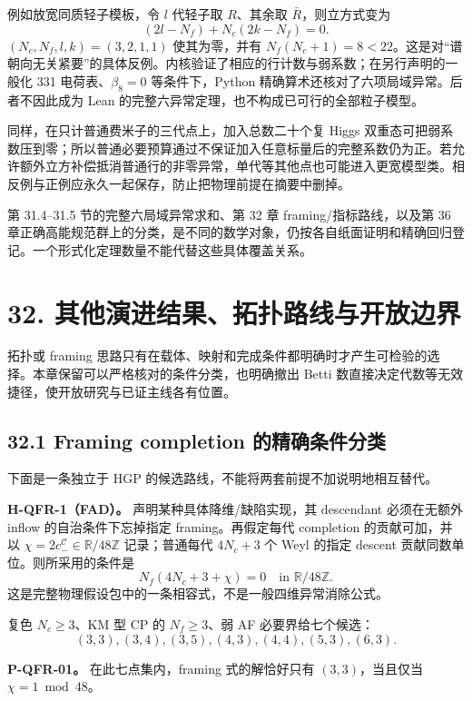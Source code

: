 \documentclass[
  11pt,
  oneside]{book}
\begin{document}
例如放宽同质轻子模板，令 \(l\) 代轻子取 \(R\)、其余取
\(\bar R\)，则立方式变为 \[
(2l-N_f)+N_c(2k-N_f)=0.
\] \((N_c,N_f,l,k)=(3,2,1,1)\) 使其为零，并有
\(N_f(N_c+1)=8<22\)。这是对``谱朝向无关紧要''的具体反例。内核验证了相应的行计数与弱系数；在另行声明的一般化
331 电荷表、\(\beta_8=0\) 等条件下，Python
精确算术还核对了六项局域异常。后者不因此成为 Lean
的完整六异常定理，也不构成已可行的全部粒子模型。

同样，在只计普通费米子的三代点上，加入总数二十个复 Higgs
双重态可把弱系数压到零；所以普通必要预算通过不保证加入任意标量后的完整系数仍为正。若允许额外立方补偿抵消普通行的非零异常，单代等其他点也可能进入更宽模型类。相反例与正例应永久一起保存，防止把物理前提在摘要中删掉。

第 31.4--31.5 节的完整六局域异常求和、第 32 章 framing/指标路线，以及第
36
章正确高能规范群上的分类，是不同的数学对象，仍按各自纸面证明和精确回归登记。一个形式化定理数量不能代替这些具体覆盖关系。

\chapter{32. 其他演进结果、拓扑路线与开放边界}\label{ch-32}\hypertarget{ch-32}{}

拓扑或 framing
思路只有在载体、映射和完成条件都明确时才产生可检验的选择。本章保留可以严格核对的条件分类，也明确撤出
Betti 数直接决定代数等无效捷径，使开放研究与已证主线各有位置。

\section{32.1 Framing completion 的精确条件分类}

下面是一条独立于 HGP 的候选路线，不能将两套前提不加说明地相互替代。

\textbf{H-QFR-1（FAD）。} 声明某种具体降维/缺陷实现，其 descendant
必须在无额外 inflow 的自治条件下忘掉指定 framing。再假定每代 completion
的贡献可加，并以 \(\chi=2c_-^{\mathcal C}\in\mathbb R/48\mathbb Z\)
记录；普通每代 \(4N_c+3\) 个 Weyl 的指定 descent
贡献同数单位。则所采用的条件是 \[
N_f(4N_c+3+\chi)=0\quad\text{in }\mathbb R/48\mathbb Z.
\] 这是完整物理假设包中的一条相容式，不是一般四维异常消除公式。

复色 \(N_c\ge3\)、KM 型 CP 的 \(N_f\ge3\)、弱 AF 必要界给七个候选： \[
(3,3),(3,4),(3,5),(4,3),(4,4),(5,3),(6,3).
\]

\protect\hypertarget{p-qfr-01}{}{}

\textbf{P-QFR-01。} 在此七点集内，framing 式的解恰好只有
\((3,3)\)，当且仅当 \(\chi=1\bmod48\)。
\end{document}
